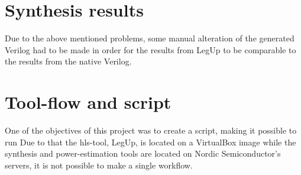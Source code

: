 \section{\label{sec:synthres}Synthesis results}
Due to the above mentioned problems, some manual alteration of the generated Verilog had to be made in order for the results from LegUp to be comparable to the results from the native Verilog.

\section{Tool-flow and script}
One of the objectives of this project was to create a script, making it possible to run Due to that the \gls{hls}-tool, LegUp, is located on a VirtualBox image while the synthesis and power-estimation tools are located on Nordic Semiconductor's servers, it is not possible to make a single workflow.